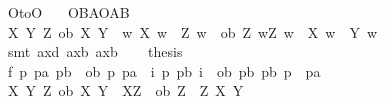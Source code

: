 \begin{isabellebody}
\endisatagproof
{\isafoldproof}%
%
\isadelimproof
\isanewline
%
\endisadelimproof
\isanewline
{}\isamarkupfalse%
\ O{\isacharunderscore}to{\isacharunderscore}O{\isacharcolon}\isanewline
\ \ \ {\isachardoublequoteopen}{\isasymTurnstile}{\isacharparenleft}O{\isacharbraceleft}B{\isacharbar}A{\isacharbraceright}\isactrlbold {\isasymrightarrow}O{\isacharbraceleft}{\isacharparenleft}A\isactrlbold {\isasymrightarrow}B{\isacharparenright}{\isacharbar}\isactrlbold {\isasymtop}{\isacharbraceright}{\isacharparenright}{\isachardoublequoteclose}\isanewline
%
\isadelimproof
%
\endisadelimproof
%
\isatagproof
{}\isamarkupfalse%
{\isacharminus}\isanewline
\ \ \isamarkupfalse%
\ {\isachardoublequoteopen}{\isasymforall}X\ Y\ Z{\isachardot}\ {\isacharparenleft}ob\ X\ Y\ {\isasymand}\ {\isacharparenleft}{\isasymforall}w{\isachardot}\ X\ w\ {\isasymlongrightarrow}\ Z\ w{\isacharparenright}{\isacharparenright}\ {\isasymlongrightarrow}\ ob\ Z\ {\isacharparenleft}{\isasymlambda}w{\isachardot}{\isacharparenleft}Z\ w\ {\isasymand}\ {\isasymnot}X\ w{\isacharparenright}\ {\isasymor}\ Y\ w{\isacharparenright}{\isachardoublequoteclose}\isanewline
\ \ \isamarkupfalse%
\ {\isacharparenleft}smt\ ax{\isacharunderscore}{}d\ ax{\isacharunderscore}{}b\ ax{\isacharunderscore}{}b{\isacharprime}{\isacharprime}{\isacharparenright}\isanewline
\ \ \isamarkupfalse%
\ {\isacharquery}thesis\isanewline
\ \ \isamarkupfalse%
\ {\isacharminus}\isanewline
\ \ \ \ \isamarkupfalse%
\ f{}{\isacharcolon}\ {\isachardoublequoteopen}{\isasymforall}p\ pa\ pb{\isachardot}\ {\isacharparenleft}{\isacharparenleft}{\isasymnot}\ {\isacharparenleft}ob\ p\ pa{\isacharparenright}{\isacharparenright}\ {\isasymor}\ {\isacharparenleft}{\isasymexists}i{\isachardot}\ {\isacharparenleft}p\isactrlbold {\isasymand}{\isacharparenleft}\isactrlbold {\isasymnot}\ pb{\isacharparenright}{\isacharparenright}\ i{\isacharparenright}{\isacharparenright}\ {\isasymor}\ {\isacharparenleft}ob\ pb\ {\isacharparenleft}{\isacharparenleft}pb\isactrlbold {\isasymand}{\isacharparenleft}\isactrlbold {\isasymnot}\ p{\isacharparenright}{\isacharparenright}\isactrlbold {\isasymor}\ \ pa{\isacharparenright}{\isacharparenright}{\isachardoublequoteclose}\isanewline
\ \ \ \ \ \ \isamarkupfalse%
\ {\isacartoucheopen}{\isasymforall}X\ Y\ Z{\isachardot}\ ob\ X\ Y\ {\isasymand}\ {\isacharparenleft}{\isasymTurnstile}{\isacharparenleft}X\isactrlbold {\isasymrightarrow}Z{\isacharparenright}{\isacharparenright}\ {\isasymlongrightarrow}\ ob\ Z\ {\isacharparenleft}\ {\isacharparenleft}Z\isactrlbold {\isasymand}{\isacharparenleft}\isactrlbold {\isasymnot}\ X{\isacharparenright}{\isacharparenright}\isactrlbold {\isasymor}\ Y{\isacharparenright}{\isacartoucheclose}\ \isamarkupfalse%

\end{isabellebody}
